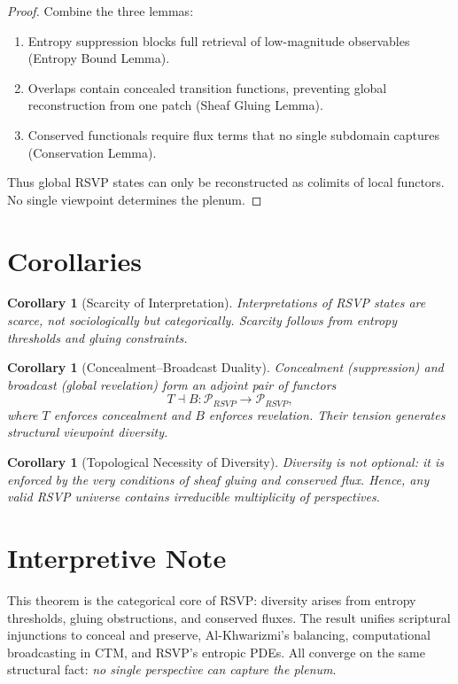 \documentclass[a4paper,11pt,openany]{book}
\newtheorem{corollary}[theorem]{Corollary}
\begin{document}
\begin{proof}
Combine the three lemmas:
\begin{enumerate}
  \item Entropy suppression blocks full retrieval of low-magnitude observables (Entropy Bound Lemma).
  \item Overlaps contain concealed transition functions, preventing global reconstruction from one patch (Sheaf Gluing Lemma).
  \item Conserved functionals require flux terms that no single subdomain captures (Conservation Lemma).
\end{enumerate}
Thus global RSVP states can only be reconstructed as colimits of local functors.  
No single viewpoint determines the plenum.  
\end{proof}

\section{Corollaries}

\begin{corollary}[Scarcity of Interpretation]
Interpretations of RSVP states are scarce, not sociologically but categorically.  
Scarcity follows from entropy thresholds and gluing constraints.  
\end{corollary}

\begin{corollary}[Concealment–Broadcast Duality]
Concealment (suppression) and broadcast (global revelation) form an adjoint pair of functors
\[
T \dashv B : \mathcal{P}_{RSVP} \to \mathcal{P}_{RSVP},
\]
where $T$ enforces concealment and $B$ enforces revelation. Their tension generates structural viewpoint diversity.  
\end{corollary}

\begin{corollary}[Topological Necessity of Diversity]
Diversity is not optional: it is enforced by the very conditions of sheaf gluing and conserved flux.  
Hence, any valid RSVP universe contains irreducible multiplicity of perspectives.  
\end{corollary}

\section{Interpretive Note}

This theorem is the categorical core of RSVP: diversity arises from entropy thresholds, 
gluing obstructions, and conserved fluxes. The result unifies scriptural injunctions 
to conceal and preserve, Al-Khwarizmi’s balancing, computational broadcasting in CTM, 
and RSVP’s entropic PDEs. All converge on the same structural fact: 
\emph{no single perspective can capture the plenum}.  
\end{document}
